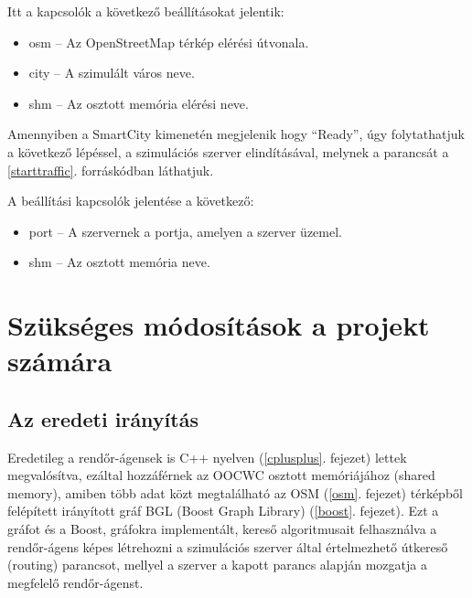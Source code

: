 \documentclass[a4paper,12pt]{report}
\begin{document}


Itt a kapcsolók a következő beállításokat jelentik:

\begin{itemize}
\item osm -- Az OpenStreetMap térkép elérési útvonala.
\item city -- A szimulált város neve.
\item shm -- Az osztott memória elérési neve.
\end{itemize}

Amennyiben a SmartCity kimenetén megjelenik hogy ``Ready'', úgy folytathatjuk a következő lépéssel, a szimulációs szerver elindításával, melynek a parancsát a \ref{starttraffic}. forráskódban láthatjuk.



A beállítási kapcsolók jelentése a következő:

\begin{itemize}
\item port -- A szervernek a portja, amelyen a szerver üzemel.
\item shm -- Az osztott memória neve.
\end{itemize}

\section{Szükséges módosítások a projekt számára}
\label{changes}

\subsection{Az eredeti irányítás}
\label{originalrouting}

Eredetileg a rendőr-ágensek is C++ nyelven (\ref{cplusplus}. fejezet) lettek megvalósítva, ezáltal hozzáférnek az OOCWC osztott memóriájához (shared memory), amiben több adat közt megtalálható az OSM \citep{osm} (\ref{osm}. fejezet) térképből felépített irányított gráf BGL (Boost Graph Library) (\ref{boost}. fejezet). Ezt a gráfot és a Boost, gráfokra implementált, kereső algoritmusait felhasználva a rendőr-ágens képes létrehozni a szimulációs szerver által értelmezhető útkereső (routing) parancsot, mellyel a szerver a kapott parancs alapján mozgatja a megfelelő rendőr-ágenst. 
\end{document}
